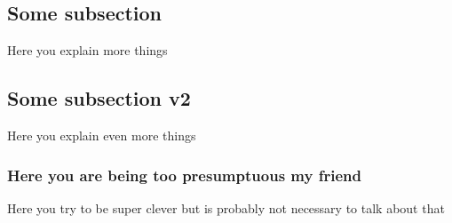 \documentclass[../main.tex]{subfiles}
\begin{document}
\subsection{Some subsection}

Here you explain more things

\subsection{Some subsection v2}

Here you explain even more things

\subsubsection{Here you are being too presumptuous my friend}

Here you try to be super clever but is probably not necessary to talk about that
\end{document}
